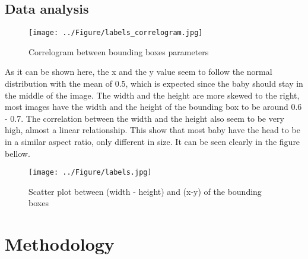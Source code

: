 \documentclass[14pt]{extreport}
\begin{document}
\section{Data analysis}

\begin{figure}[H]
    \centering
    \texttt{[image: ../Figure/labels\_correlogram.jpg]}
    \caption{Correlogram between bounding boxes parameters}
    \label{correlogram of bbox params}
\end{figure}
As it can be shown here, the x and the y value seem to follow the normal distribution with the mean of 0.5, which is expected since the baby should stay in the middle of the image. The width and the height are more skewed to the right, most images have the width and the height of the bounding box to be around 0.6 - 0.7. The correlation between the width and the height also seem to be very high, almost a linear relationship. This show that most baby have the head to be in a similar aspect ratio, only different in size. It can be seen clearly in the figure bellow.

\begin{figure}[H]
    \centering
    \captionsetup{justification=centering, margin=2.5cm}
    \texttt{[image: ../Figure/labels.jpg]}
    \caption{Scatter plot between (width - height) and (x-y) of the bounding boxes}
    \label{scatter plot of bbox params}
\end{figure}

\chapter{Methodology}
\end{document}
